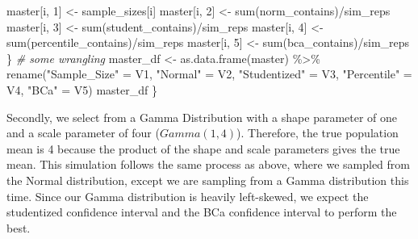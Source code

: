 \documentclass[12pt]{article}
\newenvironment{Shaded}{\begin{snugshade}}{\end{snugshade}}
\newcommand{\CommentTok}[1]{\textcolor[rgb]{0.56,0.35,0.01}{\textit{#1}}}
\newcommand{\DecValTok}[1]{\textcolor[rgb]{0.00,0.00,0.81}{#1}}
\newcommand{\FunctionTok}[1]{\textcolor[rgb]{0.00,0.00,0.00}{#1}}
\newcommand{\NormalTok}[1]{#1}
\newcommand{\OtherTok}[1]{\textcolor[rgb]{0.56,0.35,0.01}{#1}}
\newcommand{\SpecialCharTok}[1]{\textcolor[rgb]{0.00,0.00,0.00}{#1}}
\newcommand{\StringTok}[1]{\textcolor[rgb]{0.31,0.60,0.02}{#1}}
\begin{document}
\begin{Shaded}
\begin{Highlighting}[]
\NormalTok{    master[i, }\DecValTok{1}\NormalTok{] }\OtherTok{\textless{}{-}}\NormalTok{ sample\_sizes[i]}
\NormalTok{    master[i, }\DecValTok{2}\NormalTok{] }\OtherTok{\textless{}{-}} \FunctionTok{sum}\NormalTok{(norm\_contains)}\SpecialCharTok{/}\NormalTok{sim\_reps}
\NormalTok{    master[i, }\DecValTok{3}\NormalTok{] }\OtherTok{\textless{}{-}} \FunctionTok{sum}\NormalTok{(student\_contains)}\SpecialCharTok{/}\NormalTok{sim\_reps}
\NormalTok{    master[i, }\DecValTok{4}\NormalTok{] }\OtherTok{\textless{}{-}} \FunctionTok{sum}\NormalTok{(percentile\_contains)}\SpecialCharTok{/}\NormalTok{sim\_reps}
\NormalTok{    master[i, }\DecValTok{5}\NormalTok{] }\OtherTok{\textless{}{-}} \FunctionTok{sum}\NormalTok{(bca\_contains)}\SpecialCharTok{/}\NormalTok{sim\_reps}
\NormalTok{  \}}
  \CommentTok{\# some wrangling}
\NormalTok{  master\_df }\OtherTok{\textless{}{-}} \FunctionTok{as.data.frame}\NormalTok{(master) }\SpecialCharTok{\%\textgreater{}\%} 
      \FunctionTok{rename}\NormalTok{(}\StringTok{"Sample\_Size"} \OtherTok{=}\NormalTok{ V1, }\StringTok{"Normal"} \OtherTok{=}\NormalTok{ V2, }\StringTok{"Studentized"} \OtherTok{=}\NormalTok{ V3, }
             \StringTok{"Percentile"} \OtherTok{=}\NormalTok{ V4, }\StringTok{"BCa"} \OtherTok{=}\NormalTok{ V5) }
\NormalTok{  master\_df}
\NormalTok{\}}
\end{Highlighting}
\end{Shaded}

Secondly, we select from a Gamma Distribution with a shape parameter of
one and a scale parameter of four (\(Gamma(1,4)\)). Therefore, the true
population mean is 4 because the product of the shape and scale
parameters gives the true mean. This simulation follows the same process
as above, where we sampled from the Normal distribution, except we are
sampling from a Gamma distribution this time. Since our Gamma
distribution is heavily left-skewed, we expect the studentized
confidence interval and the BCa confidence interval to perform the best.
\end{document}

